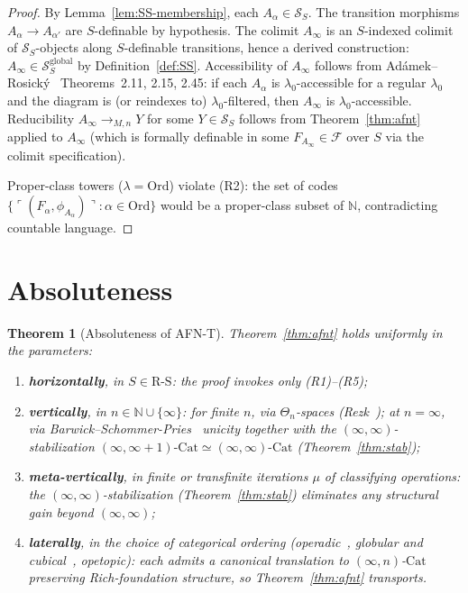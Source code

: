 \documentclass[11pt]{article}
\theoremstyle{plain}
\newtheorem{theorem}{Theorem}[section]
\theoremstyle{definition}
\newcommand{\RS}{\mathrm{R\text{-}S}}
\newcommand{\cS}{\mathcal{S}}
\newcommand{\cF}{\mathcal{F}}
\newcommand{\Cat}{\mathrm{Cat}}
\begin{document}
\begin{proof}
By Lemma~\ref{lem:SS-membership}, each $A_\alpha \in \cS_S$. The transition morphisms $A_\alpha \to A_{\alpha'}$ are $S$-definable by hypothesis. The colimit $A_\infty$ is an $S$-indexed colimit of $\cS_S$-objects along $S$-definable transitions, hence a derived construction: $A_\infty \in \cS_S^{\mathrm{global}}$ by Definition~\ref{def:SS}. Accessibility of $A_\infty$ follows from Ad\'amek--Rosick\'y~\cite{AdamekRosicky1994} Theorems~2.11, 2.15, 2.45: if each $A_\alpha$ is $\lambda_0$-accessible for a regular $\lambda_0$ and the diagram is (or reindexes to) $\lambda_0$-filtered, then $A_\infty$ is $\lambda_0$-accessible. Reducibility $A_\infty \to_{M, n} Y$ for some $Y \in \cS_S$ follows from Theorem~\ref{thm:afnt} applied to $A_\infty$ (which is formally definable in some $F_{A_\infty} \in \cF$ over $S$ via the colimit specification).

Proper-class towers ($\lambda = \mathrm{Ord}$) violate (R2): the set of codes $\{\ulcorner (F_\alpha, \phi_{A_\alpha}) \urcorner : \alpha \in \mathrm{Ord}\}$ would be a proper-class subset of $\mathbb{N}$, contradicting countable language.
\end{proof}

\section{Absoluteness}\label{sec:absolute}

\begin{theorem}[Absoluteness of AFN-T]\label{thm:absolute}
Theorem~\ref{thm:afnt} holds uniformly in the parameters:
\begin{enumerate}
\item \textbf{horizontally}, in $S \in \RS$: the proof invokes only (R1)--(R5);
\item \textbf{vertically}, in $n \in \mathbb{N} \cup \{\infty\}$: for finite $n$, via $\Theta_n$-spaces (Rezk~\cite{Rezk2010}); at $n = \infty$, via Barwick--Schommer-Pries~\cite{BarwickSchommerPries2021} unicity together with the $(\infty, \infty)$-stabilization $(\infty, \infty + 1)\text{-}\Cat \simeq (\infty, \infty)\text{-}\Cat$ (Theorem~\ref{thm:stab});
\item \textbf{meta-vertically}, in finite or transfinite iterations $\mu$ of classifying operations: the $(\infty, \infty)$-stabilization (Theorem~\ref{thm:stab}) eliminates any structural gain beyond $(\infty, \infty)$;
\item \textbf{laterally}, in the choice of categorical ordering (operadic~\cite{LurieHA}, globular and cubical~\cite{AraMaltsiniotis2017}, opetopic): each admits a canonical translation to $(\infty, n)$-$\Cat$ preserving Rich-foundation structure, so Theorem~\ref{thm:afnt} transports.
\end{enumerate}
\end{theorem}
\end{document}
